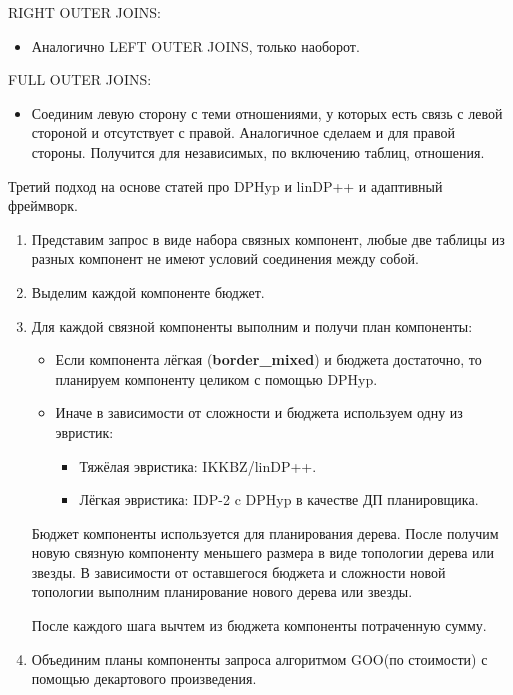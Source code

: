 \documentclass[12pt]{article}
\begin{document}
\begin{flushleft}
RIGHT OUTER JOINS:
\begin{itemize}[label={}]
    \item Аналогично LEFT OUTER JOINS, только наоборот.
\end{itemize}

FULL OUTER JOINS:
\begin{itemize}[label={}]
    \item Соединим левую сторону с теми отношениями, у которых есть связь с левой стороной и отсутствует с правой. Аналогичное сделаем и для правой стороны.
    Получится для независимых, по включению таблиц, отношения.
\end{itemize}

\begin{center}
Третий подход на основе статей про DPHyp\cite{DPhyp} и linDP++\cite{LinDP} и адаптивный фреймворк\cite{Adaptive}.
\end{center}
\begin{enumerate}
    \item Представим запрос в виде набора связных компонент, любые две таблицы из разных компонент не имеют условий соединения между собой. 
    \item Выделим каждой компоненте бюджет.
    \item Для каждой связной компоненты выполним и получи план компоненты:
    \begin{itemize}[label={}]
        \item Если компонента лёгкая (\textbf{border\_mixed}) и бюджета достаточно, то планируем компоненту целиком с помощью DPHyp.
        \item Иначе в зависимости от сложности и бюджета используем одну из эвристик:
        \begin{itemize}[label={}]
            \item Тяжёлая эвристика: IKKBZ/linDP++.
            \item Лёгкая эвристика: IDP-2 c DPHyp в качестве ДП планировщика.
        \end{itemize}
    \end{itemize}
    Бюджет компоненты используется для планирования дерева. После получим новую связную компоненту меньшего размера в виде топологии дерева или звезды.
    В зависимости от оставшегося бюджета и сложности новой топологии выполним планирование нового дерева или звезды.
    \newline
    
    После каждого шага вычтем из бюджета компоненты потраченную сумму.
    \item Объединим планы компоненты запроса алгоритмом GOO(по стоимости) с помощью декартового произведения.
\end{enumerate}



\end{flushleft}
\end{document}
